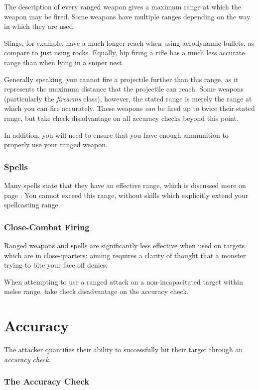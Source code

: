 The description of every ranged weapon gives a maximum range at which the weapon may be fired. Some weapons have multiple ranges depending on the way in which they are used. 

Slings, for example, have a much longer reach when using aerodynamic bullets, as compare to just using rocks. Equally, hip firing a rifle has a much less accurate range than when lying in a sniper nest. 

Generally speaking, you cannot fire a projectile further than this range, as it represents the maximum distance that the projectile can reach. Some weapons (particularly the {\it firearms} class), however, the stated range is merely the range at which you can fire accurately. These weapons {\it can} be fired up to twice their stated range, but take check disadvantage on all accuracy checks beyond this point. 

In addition, you will need to ensure that you have enough ammunition to properly use your ranged weapon.
\subsubsection{Spells}

Many spells state that they have an effective range, which is discussed more on page \pageref{S:Range}. You cannot exceed this range, without skills which explicitly extend your spellcasting range. 

\subsubsection{Close-Combat Firing}

Ranged weapons and spells are significantly less effective when used on targets which are in close-quarters: aiming requires a clarity of thought that a monster trying to bite your face off denies. 

When attempting to use a ranged attack on a non-incapacitated target within melee range, take check disadvantage on the accuracy check.

\section{Accuracy}

The attacker quantifies their ability to successfully hit their target through an {\it accuracy check}. 

\subsubsection{The Accuracy Check}

